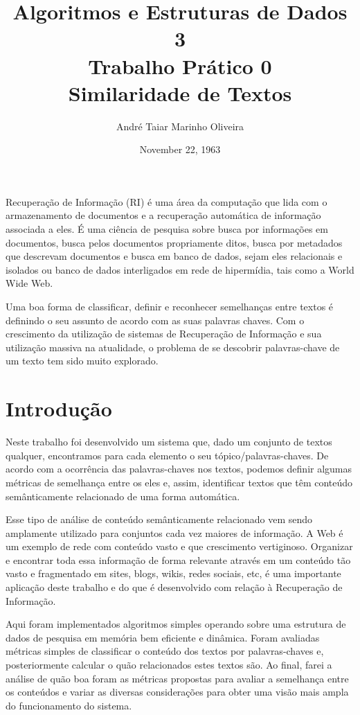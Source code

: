 \documentclass[12pt]{article}
\title{Algoritmos e Estruturas de Dados 3 \\ Trabalho Prático 0 \\
\huge{Similaridade de Textos}}
\date{November 22, 1963}
\author{André Taiar Marinho Oliveira}
\begin{document}
\maketitle

\begin{resumo}
Recuperação de Informação (RI) é uma área da computação  que lida com o armazenamento de documentos 
e a recuperação automática de informação associada a eles. É uma ciência de pesquisa sobre busca 
por informações em documentos, busca pelos documentos propriamente ditos, busca por metadados que 
descrevam documentos e busca em banco de dados, sejam eles relacionais e isolados ou banco de 
dados interligados em rede de hipermídia, tais como a World Wide Web.

Uma boa forma de classificar, definir e reconhecer semelhanças entre textos é definindo o
seu assunto de acordo com as suas palavras chaves. Com o crescimento da
utilização de sistemas de Recuperação de Informação e sua utilização massiva na
atualidade, o problema de se descobrir palavras-chave de um texto tem sido muito
explorado.
\end{resumo}

\section{Introdução}

Neste trabalho foi desenvolvido um sistema que, dado um conjunto de textos
qualquer, encontramos para cada elemento o seu tópico/palavras-chaves. De acordo
com a ocorrência das palavras-chaves nos textos, podemos definir algumas
métricas de semelhança entre os eles e, assim, identificar 
textos que têm conteúdo semânticamente relacionado de uma forma automática.

Esse tipo de análise de conteúdo semânticamente relacionado vem sendo amplamente
utilizado para conjuntos cada vez maiores de informação. A Web é um exemplo de
rede com conteúdo vasto e que crescimento vertiginoso. Organizar e encontrar
toda essa informação de forma relevante através em um conteúdo tão vasto e
fragmentado em sites, blogs, wikis, redes sociais, etc, é uma importante
aplicação deste trabalho e do que é desenvolvido com relação à Recuperação de
Informação.

Aqui foram implementados algoritmos simples operando sobre uma estrutura de
dados de pesquisa em memória bem eficiente e dinâmica. Foram avaliadas métricas
simples de classificar o conteúdo dos textos por palavras-chaves e,
posteriormente calcular o quão relacionados estes textos são. Ao final, farei a
análise de quão boa foram as métricas propostas para avaliar a semelhança entre
os conteúdos e variar as diversas considerações para obter uma visão mais ampla
do funcionamento do sistema.
\end{document}
